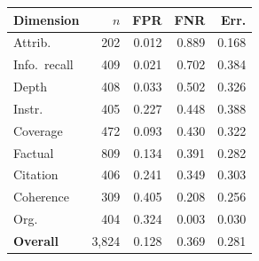 \begin{tabular}{lrrrr}
\toprule
Dimension & $n$ & FPR & FNR & Err.\\
\midrule
Attrib. & 202 & 0.012 & 0.889 & 0.168 \\
Info.\ recall & 409 & 0.021 & 0.702 & 0.384 \\
Depth & 408 & 0.033 & 0.502 & 0.326 \\
Instr. & 405 & 0.227 & 0.448 & 0.388 \\
Coverage & 472 & 0.093 & 0.430 & 0.322 \\
Factual & 809 & 0.134 & 0.391 & 0.282 \\
Citation & 406 & 0.241 & 0.349 & 0.303 \\
Coherence & 309 & 0.405 & 0.208 & 0.256 \\
Org. & 404 & 0.324 & 0.003 & 0.030 \\
\midrule
\textbf{Overall} & 3,824 & 0.128 & 0.369 & 0.281 \\
\bottomrule
\end{tabular}